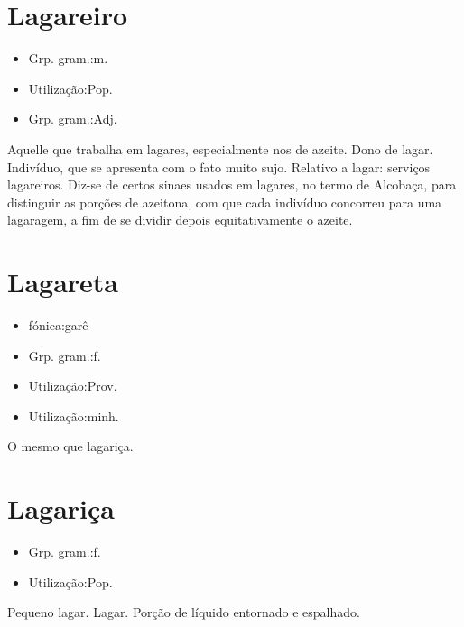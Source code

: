 \section{Lagareiro}
\begin{itemize}
\item {Grp. gram.:m.}
\end{itemize}
\begin{itemize}
\item {Utilização:Pop.}
\end{itemize}
\begin{itemize}
\item {Grp. gram.:Adj.}
\end{itemize}
Aquelle que trabalha em lagares, especialmente nos de azeite.
Dono de lagar.
Indivíduo, que se apresenta com o fato muito sujo.
Relativo a lagar: \textunderscore serviços lagareiros\textunderscore .
Diz-se de certos sinaes usados em lagares, no termo de Alcobaça, para distinguir as porções de azeitona, com que cada indivíduo concorreu para uma lagaragem, a fim de se dividir depois equitativamente o azeite.
\section{Lagareta}
\begin{itemize}
\item {fónica:garê}
\end{itemize}
\begin{itemize}
\item {Grp. gram.:f.}
\end{itemize}
\begin{itemize}
\item {Utilização:Prov.}
\end{itemize}
\begin{itemize}
\item {Utilização:minh.}
\end{itemize}
O mesmo que \textunderscore lagariça\textunderscore .
\section{Lagariça}
\begin{itemize}
\item {Grp. gram.:f.}
\end{itemize}
\begin{itemize}
\item {Utilização:Pop.}
\end{itemize}
Pequeno lagar.
Lagar.
Porção de líquido entornado e espalhado.
